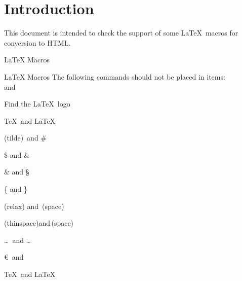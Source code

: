 \documentclass{article}
\begin{document}
\section*{Introduction}

This document is intended to check the support of some \LaTeX\ macros for 
conversion to HTML.

\begin{quiz}[points=1]{LaTeX Macros}
\begin{multi}{LaTeX Macros}
The following commands should not be placed in items: \\ and \par
Find the \LaTeX\ logo
\item* \TeX\ and \LaTeX
\item (tilde)~and \#
\item \$ and \&
\item \& and \S
\item \{ and \}
\item (relax) \relax and\ (space)
\item (thinspace)\thinspace and\,(space)
\item \ldots\ and \dots
\item \euro\ and \texteuro
\item \TeX\ and \LaTeX
\end{multi}

\end{quiz}
\end{document}
